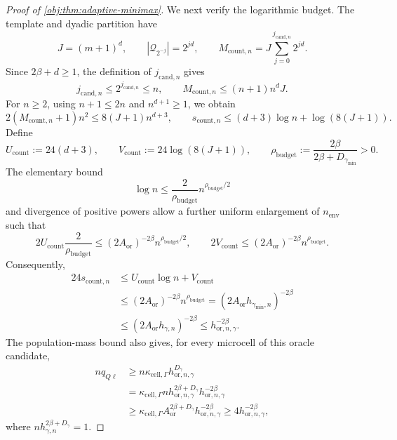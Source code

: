 \begin{proof}[Proof of \cref{obj:thm:adaptive-minimax}]
We next verify the logarithmic budget. The template and dyadic partition have
\[
J=(m+1)^d,
\qquad
|\mathcal Q_{2^{-j}}|=2^{jd},
\qquad
M_{\mathrm{count},n}
=J\sum_{j=0}^{j_{\mathrm{cand},n}}2^{jd}.
\]
Since \(2\beta+d\ge1\), the definition of \(j_{\mathrm{cand},n}\) gives
\[
j_{\mathrm{cand},n}\le2^{j_{\mathrm{cand},n}}\le n,
\qquad
M_{\mathrm{count},n}\le(n+1)n^dJ.
\]
For \(n\ge2\), using \(n+1\le2n\) and \(n^{d+1}\ge1\), we obtain
\[
2(M_{\mathrm{count},n}+1)n^2
\le8(J+1)n^{d+3},
\qquad
s_{\mathrm{count},n}
\le(d+3)\log n+\log(8(J+1)).
\]
Define
\[
U_{\mathrm{count}}:=24(d+3),
\qquad
V_{\mathrm{count}}:=24\log(8(J+1)),
\qquad
\rho_{\mathrm{budget}}
:=\frac{2\beta}{2\beta+D_{\gamma_{\min}}}>0.
\]
The elementary bound
\[
\log n\le\frac2{\rho_{\mathrm{budget}}}
 n^{\rho_{\mathrm{budget}}/2}
\]
and divergence of positive powers allow a further uniform enlargement of \(n_{\mathrm{env}}\) such that
\[
2U_{\mathrm{count}}\frac2{\rho_{\mathrm{budget}}}
\le(2A_{\mathrm{or}})^{-2\beta}
 n^{\rho_{\mathrm{budget}}/2},
\qquad
2V_{\mathrm{count}}
\le(2A_{\mathrm{or}})^{-2\beta}n^{\rho_{\mathrm{budget}}}.
\]
Consequently,
\[
\begin{aligned}
24s_{\mathrm{count},n}
&\le U_{\mathrm{count}}\log n+V_{\mathrm{count}}\\
&\le(2A_{\mathrm{or}})^{-2\beta}n^{\rho_{\mathrm{budget}}}
=(2A_{\mathrm{or}}h_{\gamma_{\min},n})^{-2\beta}\\
&\le(2A_{\mathrm{or}}h_{\gamma,n})^{-2\beta}
\le h_{\mathrm{or},n,\gamma}^{-2\beta}.
\end{aligned}
\]
The population-mass bound also gives, for every microcell of this oracle candidate,
\[
\begin{aligned}
nq_{Q\ell}
&\ge n\kappa_{\mathrm{cell},\Gamma}
 h_{\mathrm{or},n,\gamma}^{D_\gamma}\\
&=\kappa_{\mathrm{cell},\Gamma}
 n h_{\mathrm{or},n,\gamma}^{2\beta+D_\gamma}
 h_{\mathrm{or},n,\gamma}^{-2\beta}\\
&\ge\kappa_{\mathrm{cell},\Gamma}
 A_{\mathrm{or}}^{2\beta+D_\gamma}
 h_{\mathrm{or},n,\gamma}^{-2\beta}
\ge4h_{\mathrm{or},n,\gamma}^{-2\beta},
\end{aligned}
\]
where \(nh_{\gamma,n}^{2\beta+D_\gamma}=1\).


\end{proof}
